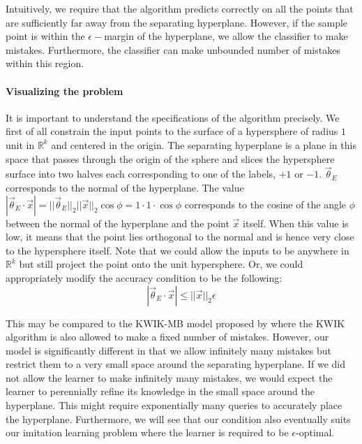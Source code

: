 Intuitively, we require that the algorithm predicts correctly on all the points that are sufficiently far away from the separating hyperplane. However, if the sample point is within the $\epsilon-$margin of the hyperplane, we allow the classifier to make mistakes. Furthermore, the classifier can make unbounded number of mistakes within this region.

\paragraph{Visualizing the problem} It is important to understand the specifications of the algorithm precisely. We first of all constrain the input points to the surface of a hypersphere of radius $1$ unit in $\mathbb{R}^k$ and centered in the origin. The separating hyperplane is a plane in this space that passes through the origin of the sphere and slices the hypersphere surface into two halves each corresponding to one of the labels, $+1$ or $-1$. $\vec{\theta}_E$ corresponds to the normal of the hyperplane. The value $|\vec{\theta}_E \cdot \vec{x}| = ||\vec{\theta}_E||_2 ||\vec{x} ||_2 \cos\phi = 1 \cdot 1 \cdot \cos \phi  $ corresponds to the cosine of the angle $\phi$ between the normal of the hyperplane and the point $\vec{x}$ itself. When this value is low, it means that the point lies orthogonal to the normal and is hence very close to the hypersphere itself. 
Note that we could allow the inputs to be anywhere in $\mathbb{R}^k$ but still project the point onto the unit hypersphere. Or, we could appropriately modify the accuracy condition to be the following:
\begin{equation}
 |\vec{\theta}_E \cdot \vec{x}| \leq ||\vec{x}||_2 \epsilon
\end{equation}

This may be compared to the KWIK-MB model proposed by \citet{DBLP:conf/nips/SayediZB10}  where the KWIK algorithm is also allowed to make a fixed number of mistakes. However, our model is significantly different in that we allow infinitely many mistakes but restrict them to a very small space around the separating hyperplane. If we did not allow the learner to make infinitely many mistakes, we would expect the learner to perennially refine its knowledge in the small space around the hyperplane. This might require exponentially many queries to accurately place the hyperplane. Furthermore, we will see that our condition also eventually suits our imitation learning problem where the learner is required to be $\epsilon$-optimal.   


